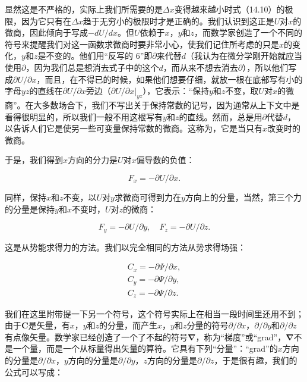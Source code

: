 \documentclass[12pt,oneside]{book}
\providecommand{\FLPvec}[1]{\boldsymbol{#1}}
\providecommand{\FLPC}[0]{\FLPvec{C}}
\providecommand{\FLPnabla}[0]{\boldsymbol{\nabla}}
\providecommand{\ddpl}[2]{\partial{#1}/\partial{#2}}
\begin{document}
显然这是不严格的，实际上我们所需要的是$\Delta x$变得越来越小时式（14.10）的极限，因为它只有在$\Delta x$趋于无穷小的极限时才是正确的。我们认识到这正是$U$对$x$的微商，因此倾向于写成$-dU/dx$。但$U$依赖于$x$，$y$和$z$，而数学家创造了一个不同的符号来提醒我们对这一函数求微商时要非常小心，使我们记住所考虑的只是$x$的变化，$y$和$z$是不变的。他们用“反写的 6”即$\partial$来代替$d$（我认为在微分学刚开始就应当使用$\partial$，因为我们总是想消去式子中的这个$d$，而从来不想去消去$\partial$），所以他们写成$\ddpl{U}{x}$，而且，在不得已的时候，如果他们想要仔细，就放一根在底部写有小的字母$yz$的直线在$\ddpl{U}{x}$旁边（$\ddpl{U}{x}|_{yz}$），它表示：“保持$y$和$z$不变，取$U$对$x$的微商”。在大多数场合下，我们不写出关于保持常数的记号，因为通常从上下文中是看得很明显的，所以我们一般不用这根写有$y$和$z$的直线。然而，总是用$\partial$代替$d$，以告诉人们它是使另一些可变量保持常数的微商。这称为，它是当只有$x$改变时的微商。


于是，我们得到$x$方向的分力是$U$对$x$偏导数的负值：

\begin{equation}
\label{Eq:I:14:11}
F_x=-\ddpl{U}{x}.
\end{equation}


同样，保持$x$和$z$不变，以$U$对$y$求微商可得到力在$y$方向上的分量，当然，第三个力的分量是保持$y$和$x$不变时，$U$对$z$的微商：

\begin{equation}
\label{Eq:I:14:12}
F_y=-\ddpl{U}{y},\quad
F_z=-\ddpl{U}{z}.
\end{equation}

这是从势能求得力的方法。我们以完全相同的方法从势求得场强：


\begin{equation}
\begin{gathered}
C_x=-\ddpl{\Psi}{x},\\[.5ex]
C_y=-\ddpl{\Psi}{y},\\[.5ex]
C_z=-\ddpl{\Psi}{z}.
\end{gathered}
\label{Eq:I:14:13}
\end{equation}

我们在这里附带提一下另一个符号，这个符号实际上在相当一段时间里还用不到；由于$\FLPC$是矢量，有$x$，$y$和$z$的分量，而产生$x$，$y$和$z$分量的符号$\ddpl{}{x}$，$\ddpl{}{y}$和$\ddpl{}{z}$有点像矢量。数学家已经创造了一个了不起的符号$\FLPnabla$，称为“梯度”或“grad”，$\FLPnabla$不是一个量，而是一个从标量得出矢量的算符。它具有下列“分量”：“grad”的$x$方向的分量是$\ddpl{}{x}$，$y$方向的分量是$\ddpl{}{y}$，$z$方向的分量是$\ddpl{}{z}$，于是很有趣，我们的公式可以写成：
\end{document}

